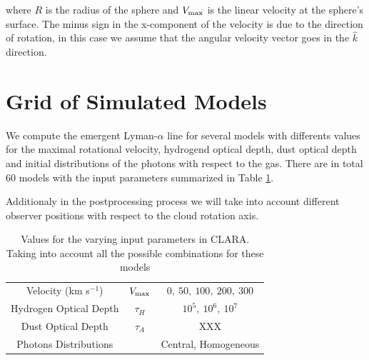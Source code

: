 \documentclass[usenatbib]{mn2e}
\begin{document}
where $R$ is the radius of the sphere and $V_{\rm max}$ is the linear
velocity at the sphere's surface. The minus sign in the x-component of the velocity is due to
the direction of rotation, in this case we assume that the angular
velocity vector goes in the $\hat{k}$ direction.


\section{Grid of Simulated Models}
\label{sec:models}


We compute the emergent Lyman-$\alpha$ line for several models with
differents values for the maximal rotational velocity, hydrogend optical
depth, dust optical depth and initial distributions of the photons
with respect to the gas. There are in total 60 models with the input
parameters summarized in Table  \ref{table:models}. 



Additionaly in the postprocessing process we will take into account
different observer positions with respect to the cloud rotation
axis.


\begin{table}
\begin{center}
\begin{tabular}{ccc}\hline
Velocity (km s$^{-1}$) & $V_{\rm max}$&$0,\ 50,\ 100,\ 200,\ 300$\\
Hydrogen Optical Depth & $\tau_{H} $ & $10^{5},\ 10^{6},\ 10^{7}$\\
Dust Optical Depth & $\tau_{A}$ & XXX \\
Photons Distributions & & Central, Homogeneous\\
\hline
\end{tabular}
\caption{
Values for the varying input parameters in CLARA. Taking into account
all the possible combinations for these models
} 
\label{table:models}
\end{center}
\end{table}
\end{document}
